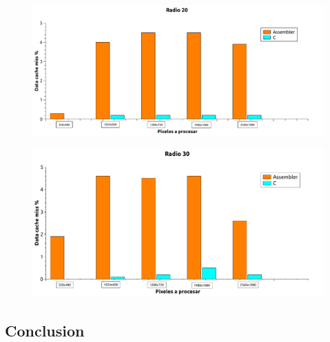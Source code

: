 \begin{figure}[H]
\begin{center}
  \includegraphics[width=\linewidth]{cache/Radio20.pdf} 
\end{center}
\end{figure}

\begin{figure}[H]
\begin{center}
  \includegraphics[width=\linewidth]{cache/Radio30.pdf}
\end{center}
\end{figure}

\subsection{Conclusion} 


